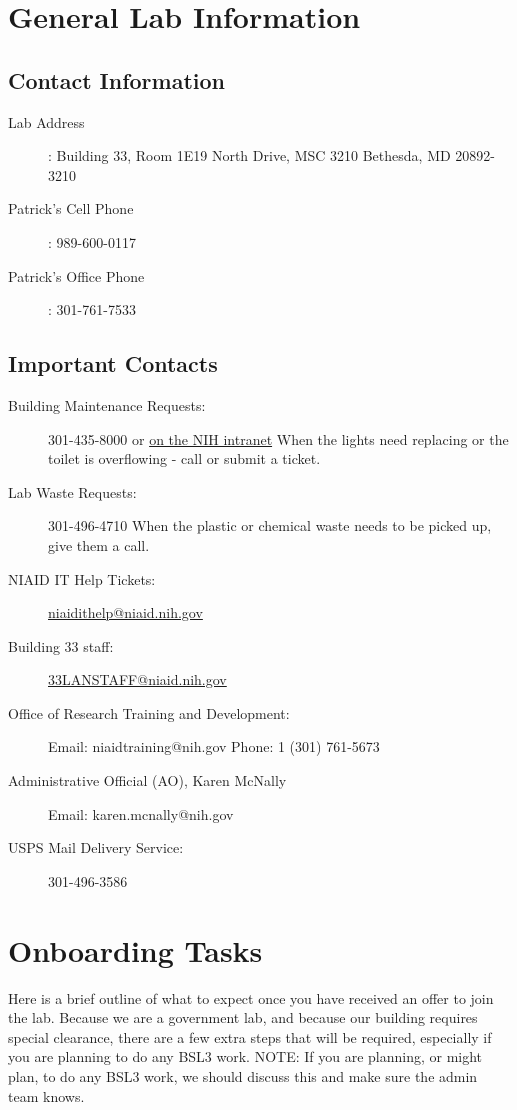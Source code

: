 \documentclass[10pt, letterpaper, twocolumn]{article} %
\begin{document}
\section{General Lab Information}
\subsection{Contact Information}
\begin{description}
\item [Lab Address]: \newline Building 33, Room 1E19  North Drive, MSC 3210 \newline Bethesda, MD 20892-3210
\item [Patrick's Cell Phone]: 989-600-0117
\item [Patrick's Office Phone]: 301-761-7533
\end{description}

\subsection{Important Contacts}
\begin{description}
\item [Building Maintenance Requests:] 301-435-8000 or \href{https://www.orf.od.nih.gov/PropertyManagement/MaintenanceServiceRequests/Pages/default.aspx}{on the NIH intranet}
When the lights need replacing or the toilet is overflowing - call or submit a ticket. 
\item [Lab Waste Requests:] 301-496-4710
When the plastic or chemical waste needs to be picked up, give them a call. 
\item [NIAID IT Help Tickets:]
\href{mailto:niaidithelp@niaid.nih.gov}{niaidithelp@niaid.nih.gov}
\item [Building 33 staff:] \href{mailto:33LANSTAFF@niaid.nih.gov}{33LANSTAFF@niaid.nih.gov}
\item [Office of Research Training and Development:]
Email: niaidtraining@nih.gov\newline
Phone: 1 (301) 761-5673
\item [Administrative Official (AO), Karen McNally]
Email: karen.mcnally@nih.gov
\item [USPS Mail Delivery Service:] 301-496-3586
\end{description}

\section{Onboarding Tasks}
Here is a brief outline of what to expect once you have received an offer to join the lab. Because we are a government lab, and because our building requires special clearance, there are a few extra steps that will be required, especially if you are planning to do any BSL3 work.
NOTE: If you are planning, or might plan, to do any BSL3 work, we should discuss this and make sure the admin team knows.
\end{document}
